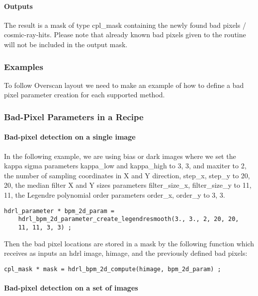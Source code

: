 \paragraph{Outputs}

The result is a mask of type cpl\_mask containing the newly found bad
pixels / cosmic-ray-hits. Please note that already known bad pixels given to the routine
will not be included in the output mask.

\subsubsection{Examples}
To follow Overscan layout we need to make an example of how to define
a bad pixel parameter creation for each supported method.


\subsubsection{Bad-Pixel Parameters in a Recipe}
\paragraph{Bad-pixel detection on a single image}

In the following example, we are using bias or dark images
where we set the kappa sigma parameters
kappa\_low and kappa\_high to 3, 3, and
maxiter to 2, 
the number of sampling coordinates in X and Y direction,
step\_x, step\_y to 20, 20,
the median filter X and Y sizes parameters  
filter\_size\_x, filter\_size\_y to 11, 11,
the Legendre polynomial order parameters 
order\_x, order\_y to 3, 3.


\begin{lstlisting}
hdrl_parameter * bpm_2d_param = 
    hdrl_bpm_2d_parameter_create_legendresmooth(3., 3., 2, 20, 20, 
    11, 11, 3, 3) ;
\end{lstlisting}

Then the bad pixel locations are stored in a mask by the following
function which receives as inputs an hdrl image, himage, and the 
previously defined bad pixels:

\begin{lstlisting}
cpl_mask * mask = hdrl_bpm_2d_compute(himage, bpm_2d_param) ;
\end{lstlisting}



\paragraph{Bad-pixel detection on a set of images}

